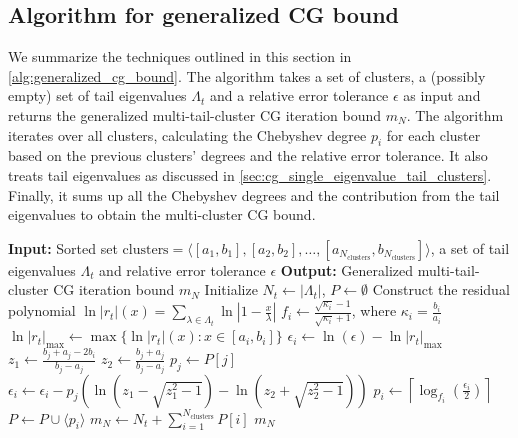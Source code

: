 \subsection{Algorithm for generalized CG bound}\label{sec:cg_multi_cluster_bound_algorithm}
We summarize the techniques outlined in this section in \cref{alg:generalized_cg_bound}. The algorithm takes a set of clusters, a (possibly empty) set of tail eigenvalues $\Lambda_t$ and a relative error tolerance $\epsilon$ as input and returns the generalized multi-tail-cluster CG iteration bound $m_N$. The algorithm iterates over all clusters, calculating the Chebyshev degree $p_i$ for each cluster based on the previous clusters' degrees and the relative error tolerance. It also treats tail eigenvalues as discussed in \cref{sec:cg_single_eigenvalue_tail_clusters}. Finally, it sums up all the Chebyshev degrees and the contribution from the tail eigenvalues to obtain the multi-cluster CG bound.
\begin{algorithm}[H]
    \caption{$\operatorname{GeneralizedCGIterationBound}(\text{clusters}, \Lambda_t, \epsilon)$}
    \begin{algorithmic}[1]
        \State \textbf{Input:} Sorted set $\text{clusters} = \langle[a_1, b_1], [a_2, b_2], \ldots, [a_{N_{\text{clusters}}}, b_{N_{\text{clusters}}}]\rangle$, a set of tail eigenvalues $\Lambda_t$ and relative error tolerance $\epsilon$
        \State \textbf{Output:} Generalized multi-tail-cluster CG iteration bound $m_N$
        \State Initialize $N_{t} \gets |\Lambda_{t}|$, $P \gets \emptyset$
        \State Construct the residual polynomial $\ln|r_{t}|(x) = \sum_{\lambda\in\Lambda_{t}} \ln\left|1 - \frac{x}{\lambda}\right|$
        \State $f_i \gets \frac{\sqrt{\kappa_i} - 1}{\sqrt{\kappa_i} + 1}$, where $\kappa_i = \frac{b_i}{a_i}$
        \State $\ln|r_{t}|_{\text{max}} \gets \max\{\ln|r_{t}|(x) : x \in [a_i, b_i]\}$
        \State $\epsilon_i \gets \ln(\epsilon) - \ln|r_{t}|_{\text{max}}$
         
        \State $z_1 \gets \frac{b_j + a_j - 2b_i}{b_j - a_j}$
        \State $z_2 \gets \frac{b_j + a_j}{b_j - a_j}$
        \State $p_j \gets P[j]$
        \State $\epsilon_i \gets \epsilon_i - p_j \left(\ln\left(z_1 - \sqrt{z_1^2 -1}\right) - \ln\left(z_2 + \sqrt{z_2^2 -1}\right)\right)$
        \EndFor
        \State $p_i \gets \left\lceil\log_{f_i}\left(\frac{\epsilon_i}{2}\right)\right\rceil$
        \State $P \gets P \cup \langle p_i \rangle$
        \EndFor
        \State $m_{N} \gets N_{t} + \sum_{i=1}^{N_{\text{clusters}}} P[i]$
        \State \Return $m_{N}$
    \end{algorithmic}
    \label{alg:generalized_cg_bound}
\end{algorithm}

